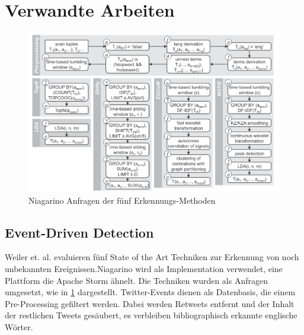 \section{Verwandte Arbeiten}

\begin{figure}
    \includegraphics[width=\textwidth]{images/eventdetect.png}
    \caption{Niagarino Anfragen der fünf Erkennungs-Methoden}
    \label{fig:eventdetect}
\end{figure}

\subsection{Event-Driven Detection}
Weiler et. al. \cite{weiler2016evaluation} evaluieren fünf State of the Art Techniken zur Erkennung von noch unbekannten Ereignissen.Niagarino wird als Implementation verwendet, eine Plattform die Apache Storm ähnelt. Die Techniken wurden als Anfragen umgesetzt, wie in \ref{fig:eventdetect} dargestellt.  Twitter-Events dienen als Datenbasis, die einem Pre-Processing gefiltert werden. Dabei werden Retweets entfernt und der Inhalt der restlichen Tweets gesäubert, es verbleiben bibliographisch erkannte englische Wörter. 


